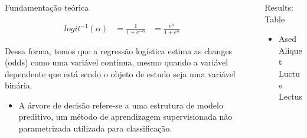 \documentclass[final,hyperref={pdfpagelabels=false}]{beamer}
\begin{document}
\begin{frame}[t]
\begin{columns}[t]
\begin{column}{.465\textwidth}
\begin{block}{Fundamenta\c c\~ao te\'orica}
\begin{itemize}
\begin{itemize}
\begin{equation}
  \label{eq:t}
  \begin{aligned}
    logit^{-1}(\alpha) &= \frac{1}{1+e^{-\alpha}} &= \frac{e^{\alpha}}{1+e^{\alpha}}
  \end{aligned}
\end{equation}

Dessa forma, temos que a regressão logística estima as changes (odds) como uma variável contínua, mesmo quando a variável dependente que está sendo o objeto de estudo seja uma variável binária. 

\end{itemize}

\begin{itemize}
\item A árvore de decisão refere-se a uma estrutura de modelo preditivo, um método de aprendizagem supervisionada não parametrizada utilizada para classificação.

\end{itemize}

\end{itemize}

\end{block}


\end{column} %

\begin{column}{.03\textwidth}\end{column} %
 
\begin{column}{.465\textwidth} %


\begin{block}{Results: Table}

\begin{itemize}
\item Ased Aliquet Luctus Lectus


\end{itemize}
\end{block}
\end{column}
\end{columns}
\end{frame}
\end{document}
